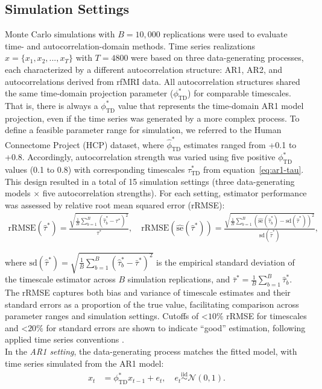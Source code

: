 \documentclass[9pt]{article}
\newcommand{\phitd}{\phi_{\scriptscriptstyle\text{TD}}}
\newcommand{\hatphitd}{\hat{\phi}^*_{\scriptscriptstyle\text{TD}}}
\newcommand{\tautd}{\tau_{\scriptscriptstyle\text{TD}}}
\begin{document}
\subsection{Simulation Settings}
Monte Carlo simulations with $B = 10,000$ replications were used to evaluate time- and autocorrelation-domain methods. Time series realizations $x = \{x_1, x_2, ..., x_T\}$ with $T=4800$ were based on three data-generating processes, each characterized by a different autocorrelation structure: AR1, AR2, and autocorrelations derived from rfMRI data. All autocorrelation structures shared the same time-domain projection parameter ($\phitd^*$) for comparable timescales. That is, there is always a $\phitd^*$ value that represents the time-domain AR1 model projection, even if the time series was generated by a more complex process. To define a feasible parameter range for simulation, we referred to the Human Connectome Project (HCP) dataset, where $\hatphitd$ estimates ranged from +0.1 to +0.8. Accordingly, autocorrelation strength was varied using five positive $\phitd^*$ values (0.1 to 0.8) with corresponding timescales $\tautd^*$ from equation~\eqref{eq:ar1-tau}. This design resulted in a total of 15 simulation settings (three data-generating models $\times$ five autocorrelation strengths). For each setting, estimator performance was assessed by relative root mean squared error (rRMSE):
\begin{align}
    \text{rRMSE}(\hat\tau^*) = \frac{\sqrt{\frac{1}{B} \sum_{b=1}^B (\hat\tau^*_b - \tau^*)^2}}{\tau^*}, \quad \text{rRMSE}(\widehat{\text{se}}(\hat\tau^*)) = \frac{\sqrt{\frac{1}{B} \sum_{b=1}^B \left(\widehat{\text{se}}(\hat\tau^*_b) - \text{sd}(\hat\tau^*)\right)^2}}{\text{sd}(\hat\tau^*)},
\end{align}

\noindent where $\text{sd}(\hat\tau^*) = \sqrt{\frac{1}{B} \sum_{b=1}^B (\hat\tau^*_b - \bar\tau^*)^2}$ is the empirical standard deviation of the timescale estimator across $B$ simulation replications, and $\bar\tau^* = \frac{1}{B} \sum_{b=1}^B \hat\tau^*_b$. The rRMSE captures both bias and variance of timescale estimates and their standard errors as a proportion of the true value, facilitating comparison across parameter ranges and simulation settings. Cutoffs of <$10\%$ rRMSE for timescales and <$20\%$ for standard errors are shown to indicate ``good'' estimation, following applied time series conventions \citep{jadon_comprehensive_2024}.\\

In the \textit{AR1 setting}, the data-generating process matches the fitted model, with time series simulated from the AR1 model:
\begin{align}\label{eq:sim-td-ar1}
    x_t &= \phitd^* x_{t-1} + e_t, \quad e_t \overset{\text{iid}}{\sim} \mathcal{N}(0, 1).
\end{align}
\end{document}
